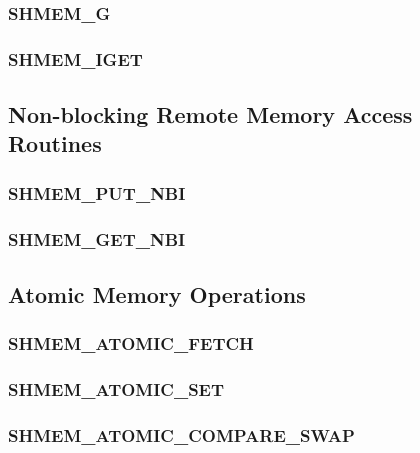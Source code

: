 \documentclass[10pt]{book}
\begin{document}
\subsubsection{\textbf{SHMEM\_G}}\label{subsec:shmem_g}


\subsubsection{\textbf{SHMEM\_IGET}}\label{subsec:shmem_iget}



\subsection{Non-blocking Remote Memory Access Routines}\label{sec:rma_nbi}

\subsubsection{\textbf{SHMEM\_PUT\_NBI}}\label{subsec:shmem_put_nbi}


\subsubsection{\textbf{SHMEM\_GET\_NBI}}\label{subsec:shmem_get_nbi}



\subsection{Atomic Memory Operations}\label{sec:amo}


\subsubsection{\textbf{SHMEM\_ATOMIC\_FETCH}}
\label{subsec:shmem_atomic_fetch}


\subsubsection{\textbf{SHMEM\_ATOMIC\_SET}}
\label{subsec:shmem_atomic_set}


\subsubsection{\textbf{SHMEM\_ATOMIC\_COMPARE\_SWAP}}
\label{subsec:shmem_atomic_compare_swap}

\end{document}
